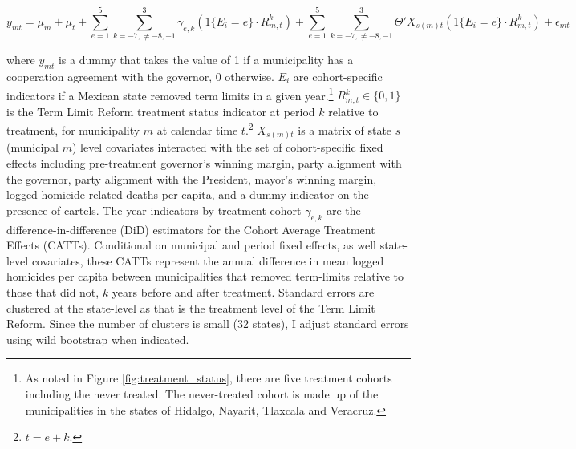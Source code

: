 \documentclass[12pt]{amsart}
\numberwithin{equation}{section}
\theoremstyle{definition}
\theoremstyle{definition}
\theoremstyle{definition}
\begin{document}
 
 \begin{equation}
\label{eq:abraham} 
y_{mt}=\mu_m + \mu_t + \sum^{5}_{e=1} \sum^3_{k=-7, \neq {-8,-1}} \gamma_{e,k}(1\{E_i=e\} \cdot R^k_{m,t}) + \sum^{5}_{e=1} \sum^3_{k=-7, \neq {-8,-1}}  \Theta'X_{s(m)t} (1\{E_i=e\} \cdot R^k_{m,t}) + \epsilon_{mt}
\end{equation} 
  
where $y_{mt}$ is a dummy that takes the value of 1 if a municipality has a cooperation agreement with the governor, 0 otherwise. $E_i$ are cohort-specific indicators if a Mexican state removed term limits in a given year.\footnote{As noted in Figure \ref{fig:treatment_status}, there are five treatment cohorts including the never treated. The never-treated cohort is made up of the municipalities in the states of Hidalgo, Nayarit, Tlaxcala and Veracruz.} $R^k_{m,t}\in \{0,1\}$  is the Term Limit Reform treatment status indicator at period $k$ relative to treatment, for municipality $m$ at calendar time $t$.\footnote{$t=e+k$.} $X_{s(m)t}$ is a matrix of state $s$ (municipal $m$) level covariates interacted with the set of cohort-specific fixed effects including pre-treatment governor's winning margin, party alignment with the governor, party alignment with the President, mayor's winning margin, logged homicide related deaths per capita, and a dummy indicator on the presence of cartels.  The year indicators by treatment cohort  $\gamma_{e,k}$ are the difference-in-difference (DiD) estimators for the Cohort Average Treatment Effects (CATTs). Conditional on municipal and period fixed effects, as well state-level covariates, these CATTs represent the annual difference in mean logged homicides per capita between municipalities that removed term-limits relative to those that did not, $k$ years before and after treatment. Standard errors are clustered at the state-level as that is the treatment level of the Term Limit Reform. Since the number of clusters is small (32 states), I adjust standard errors using wild bootstrap when indicated. 
\end{document}
